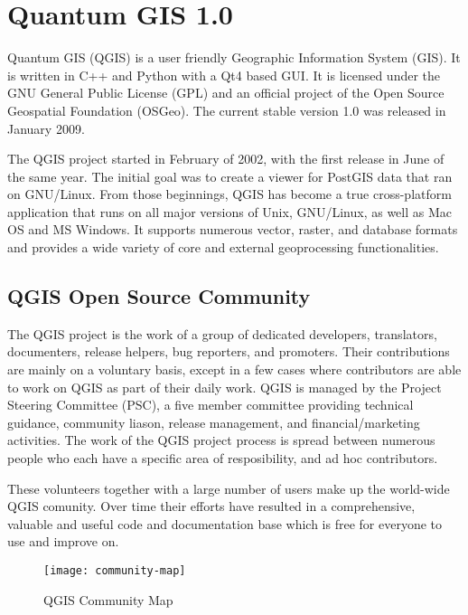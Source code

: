 \section{Quantum GIS 1.0}
\setcounter{page}{1}

Quantum GIS (QGIS) is a user friendly Geographic Information System (GIS).
It is written in C++ and Python with a Qt4 based GUI. It is licensed under the
GNU General Public License (GPL) and an official project of the Open Source
Geospatial Foundation (OSGeo). The current stable version 1.0 was released in
January 2009. 


The QGIS project started in February of 2002, with the first release in June
of the same year. The initial goal was to create a viewer for PostGIS data
that ran on GNU/Linux. From those beginnings, QGIS has become a true
cross-platform application that runs on all major versions of Unix,
GNU/Linux, as well as Mac OS and MS Windows. It supports numerous vector,
raster, and database formats and provides a wide variety of core and external
geoprocessing functionalities.

\subsection{QGIS Open Source Community}

The QGIS project is the work of a group of dedicated developers,
translators, documenters, release helpers, bug reporters, and promoters. Their 
contributions are mainly on a voluntary basis, except in a few cases where 
contributors are able to work on QGIS as part of their daily work. QGIS 
is managed by the Project Steering Committee (PSC), a five member committee
providing technical guidance, community liason, release management, and
financial/marketing activities. The work of the QGIS project process is
spread between numerous people who each have a specific area of
resposibility, and ad hoc contributors.

These volunteers together with a large number of users make up the
world-wide QGIS comunity. Over time their efforts have resulted in a comprehensive,
valuable and useful code and documentation base which is free for everyone 
to use and improve on.

\begin{figure}[h]
   \begin{center}
   \caption{QGIS Community Map}\label{fig:community-map}\smallskip
   \texttt{[image: community-map]}
\end{center}
\end{figure}

